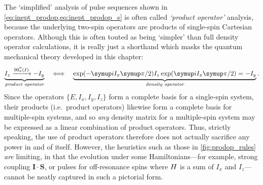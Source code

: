 The `simplified' analysis of pulse sequences shown in \cref{eq:inept_prodop,eq:inept_prodop_s} is often called \textit{`product operator'} analysis\autocite{Sorensen1984PNMRS}, because the underlying two-spin operators are products of single-spin Cartesian operators.
Although this is often touted as being `simpler' than full density operator calculations, it is really just a shorthand which masks the quantum mechanical theory developed in this chapter:
\begin{equation}
    \label{eq:product_operator_shorthand}
    \underbrace{I_z \xrightarrow{\angang{90}{x}(I)} -I_y}_{\textit{product operator}}
    \quad\Longleftrightarrow\quad
    \underbrace{\exp(-\mi I_x\cpi/2)I_z\exp(\mi I_x\cpi/2) = -I_y}_{\textit{density operator}}.
\end{equation}
Since the operators $\{E, I_x, I_y, I_z\}$ form a complete basis for a single-spin system, their products (i.e.\ product operators) likewise form a complete basis for multiple-spin systems, and so \textit{any} density matrix for a multiple-spin system may be expressed as a linear combination of product operators.
Thus, strictly speaking, the use of product operators therefore does not actually sacrifice any power in and of itself.
However, the heuristics such as those in \cref{fig:prodop_rules} \textit{are} limiting, in that the evolution under some Hamiltonians---for example, strong coupling $\symbf{I}\cdot\symbf{S}$, or pulses for off-resonance spins where $H\/$ is a sum of $I_x$ and $I_z$---cannot be neatly captured in such a pictorial form.
